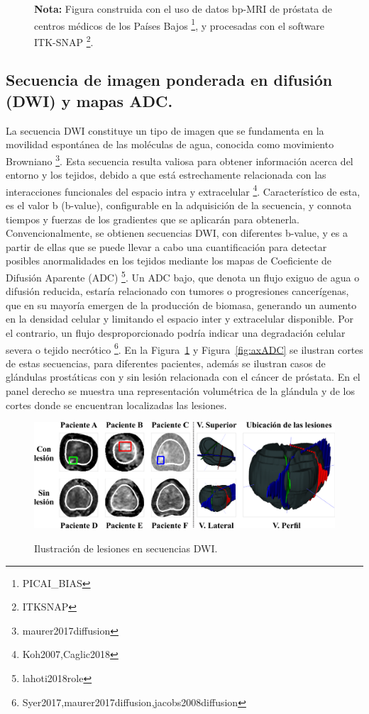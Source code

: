 \begin{figure}[h!]
\noindent \textbf{Nota:} Figura construida con el uso de datos bp-MRI de próstata de centros médicos de los Países Bajos \footnote{PICAI_BIAS}, y  procesadas con el software ITK-SNAP \footnote{ITKSNAP}.
\end{figure}



\newpage
\subsection{Secuencia de imagen ponderada en difusión (DWI) y mapas ADC. }La secuencia DWI constituye un tipo de imagen que se fundamenta en la movilidad espontánea de las moléculas de agua, conocida como movimiento Browniano \footnote{maurer2017diffusion}. Esta secuencia resulta valiosa para obtener información acerca del entorno y los tejidos, debido a que está estrechamente relacionada con las interacciones funcionales del espacio intra y extracelular \footnote{Koh2007,Caglic2018}. Característico de esta, es el valor b (b-value), configurable en la adquisición de la secuencia, y connota tiempos y fuerzas de los gradientes que se aplicarán para obtenerla. Convencionalmente, se obtienen secuencias DWI, con diferentes b-value, y es a partir de ellas que se puede llevar a cabo una cuantificación para detectar posibles anormalidades en los tejidos mediante los mapas de Coeficiente de Difusión Aparente (ADC) \footnote{lahoti2018role}. Un ADC bajo, que denota un flujo exiguo de agua o difusión reducida, estaría relacionado con tumores o progresiones cancerígenas, que en su mayoría emergen de la producción de biomasa, generando un aumento en la densidad celular y limitando el espacio inter y extracelular disponible. Por el contrario, un flujo desproporcionado podría indicar una degradación celular severa o tejido necrótico \footnote{Syer2017,maurer2017diffusion,jacobs2008diffusion}. En la 
Figura~\ref{fig:axDWI} y Figura~\ref{fig:axADC}
se ilustran cortes de estas secuencias, para diferentes pacientes, además se ilustran casos de glándulas prostáticas con y sin lesión relacionada con el cáncer de próstata. En el panel derecho se muestra una representación volumétrica de la glándula y de los cortes donde se encuentran localizadas las lesiones. 



\begin{figure}[h!]
\centering
\caption{Ilustración de lesiones en secuencias DWI.}
\includegraphics[width=1\textwidth]{imgs/DWISUMUP.png}
\label{fig:axDWI}
\end{figure}

